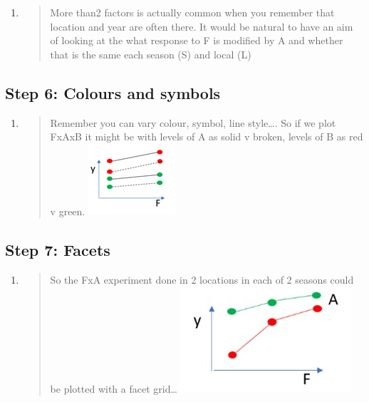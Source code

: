 \documentclass[
]{book}
\begin{document}
\begin{enumerate}
\def\labelenumi{\alph{enumi}.}
\item
  \begin{quote}
  More than2 factors is actually common when you remember that location and year are often there. It would be natural to have an aim of looking at the what response to F is modified by A and whether that is the same each season (S) and local (L)
  \end{quote}
\end{enumerate}

\hypertarget{step-6-colours-and-symbols}{%
\subsection{Step 6: Colours and symbols}\label{step-6-colours-and-symbols}}

\begin{enumerate}
\def\labelenumi{\alph{enumi}.}
\item
  \begin{quote}
  Remember you can vary colour, symbol, line style\ldots. So if we plot FxAxB it might be with levels of A as solid v broken, levels of B as red v green.
  \includegraphics{img/Picture7.png}
  \end{quote}
\end{enumerate}

\hypertarget{step-7-facets}{%
\subsection{Step 7: Facets}\label{step-7-facets}}

\begin{enumerate}
\def\labelenumi{\alph{enumi}.}
\item
  \begin{quote}
  So the FxA experiment done in 2 locations in each of 2 seasons could be plotted with a facet grid\ldots{}
  \includegraphics{img/Picture8.jpg}
  \end{quote}
\end{enumerate}
\end{document}
